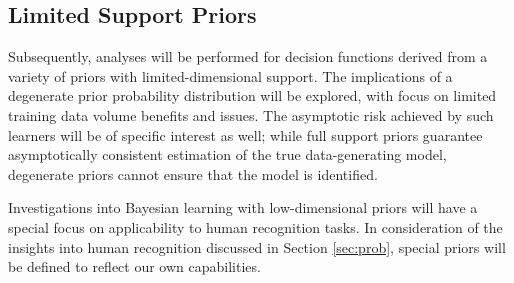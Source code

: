 \documentclass[12pt]{article}
\begin{document}
\subsection{Limited Support Priors}

Subsequently, analyses will be performed for decision functions derived from a variety of priors with limited-dimensional support. The implications of a degenerate prior probability distribution will be explored, with focus on limited training data volume benefits and issues. The asymptotic risk achieved by such learners will be of specific interest as well; while full support priors guarantee asymptotically consistent estimation of the true data-generating model, degenerate priors cannot ensure that the model is identified. 

Investigations into Bayesian learning with low-dimensional priors will have a special focus on applicability to human recognition tasks. In consideration of the insights into human recognition discussed in Section \ref{sec:prob}, special priors will be defined to reflect our own capabilities. 
\end{document}
